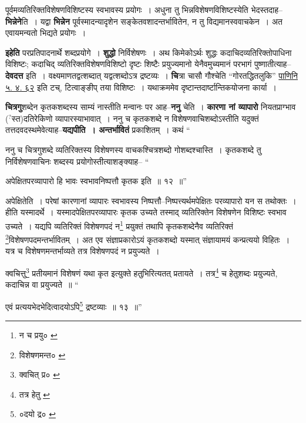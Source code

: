 \documentclass[article,12pt,a4paper]{memoir}
\newcommand{\unclear}[1]{($^{?}$#1)}
\begin{document}
	  \pstart पूर्वमव्यतिरिक्तविशेषणविशिष्टस्य स्वभावस्य प्रयोगः । अधुना तु भिन्नविशेषणविशिष्टस्येति भेदस्तदाह--\textbf{भिन्नेने}ति । यद्वा \textbf{भिन्नेन} पूर्वस्मादन्यादृशेन सङ्केतवशादन्तर्भावितेन, न तु विद्यमानस्ववाचकेन । अत एवायमन्यतो भिद्यते प्रयोगः ।
	\pend
      

	  \pstart \textbf{इहेति} परप्रतिपादनार्थे शब्दप्रयोगे । \textbf{शुद्धो} निर्विशेषणः । अथ किमेकोऽर्थः शुद्धः कदाचिदव्यतिरिक्तोपाधिना विशिष्टः; कदाचिद् व्यतिरिक्तविशेषणविशिष्टो दृष्टः शिष्टैः प्रयुज्यमानो येनैवमुच्यमानं परभागं पुष्णातीत्याह--\textbf{देवदत्त} इति । वक्ष्यमाणतद्वत्शब्दात् यद्वत्शब्दोऽत्र द्रष्टव्यः । \textbf{चि}त्रा चासौ गौश्चेति “गोरतद्धितलुकि” \href{http://http://sarit.indology.info/?cref=Pā.5.4.92}{पाणिनि ५. ४. ६२} इति टच्, टित्वाङ्ङीप् तया विशिष्टः । यथाक्रममेव दृष्टान्तदार्ष्टान्तिकयोजना कार्या ।
	\pend
      

	  \pstart \textbf{चित्रगु}शब्देन कृतकशब्दस्य साम्यं नास्तीति मन्वानः पर आह--\textbf{ननु} चेति । \textbf{कारणा नां व्यापारो} नियतप्राग्भाव \unclear{स्त}दतिरेकिणो व्यापारस्याभावात् । ननु च कृतकशब्दे न विशेषणवाचिशब्दोऽस्तीति यदुक्तं तत्तदवदस्थमेवेत्याह--\textbf{यद्यपीति । अन्तर्भावितं} प्रकाशितम् । कथं  \leavevmode{} “
	  
	ननु च चित्रगुशब्दे व्यतिरिक्तस्य विशेषणस्य वाचकश्चित्रशब्दो गोशब्दश्चास्ति । कृतकशब्दे तु निर्विशेषणवाचिनः शब्दस्य प्रयोगोस्तीत्याशङ्क्याह-- “
	  
	अपेक्षितपरव्यापारो हि भावः स्वभावनिष्पत्तौ कृतक इति ॥ १२ ॥” 
	  
	अपेक्षितेति । परेषां कारणानां व्यापारः स्वभावस्य निष्पत्तौ--निष्पत्त्यर्थमपेक्षितः परव्यापारो यन स तथोक्तः । हीति यस्मादर्थे । यस्मादपेक्षितपरव्यापारः कृतक उच्यते तस्माद् व्यतिरिक्तेन विशेषणेन विशिष्टः स्वभाव उच्यते । यद्यपि व्यतिरिक्तं विशेषणपदं न\footnote{न च प्रयु० \cite{dp-msB}} प्रयुक्तं तथापि कृतकशब्देनैव व्यतिरिक्तं \footnote{विशेषणमन्त० \cite{dp-msA} \cite{dp-edP} \cite{dp-edH} \cite{dp-edN}}विशेषणपदमन्तर्भावितम् । अत एव संज्ञाप्रकारोऽयं कृतकशब्दो यस्मात् संज्ञायामयं कन्प्रत्ययो विहितः । यत्र च विशेषणमन्तर्भाव्यते तत्र विशेषणपदं न प्रयुज्यते । 
	  
	क्वचित्तु\footnote{क्वचित् प्र० \cite{dp-msA} \cite{dp-msB} \cite{dp-edP} \cite{dp-edH} \cite{dp-edE} \cite{dp-edN}} प्रतीयमानं विशेषणं यथा कृत इत्युक्ते हतुभिरित्यतत् प्रतायते । तत्र\footnote{तत्र हेतु \cite{dp-msB}} च हेतुशब्दः प्रयुज्यते, कदाचिन्न वा प्रयुज्यते ॥ “
	  
	एवं प्रत्ययभेदभेदित्वादयोऽपि\footnote{०दयो द्र० \cite{dp-msB} \cite{dp-edP} \cite{dp-edH} \cite{dp-edE} \cite{dp-edN}} द्रष्टव्याः ॥ १३ ॥” 
	  
\end{document}
